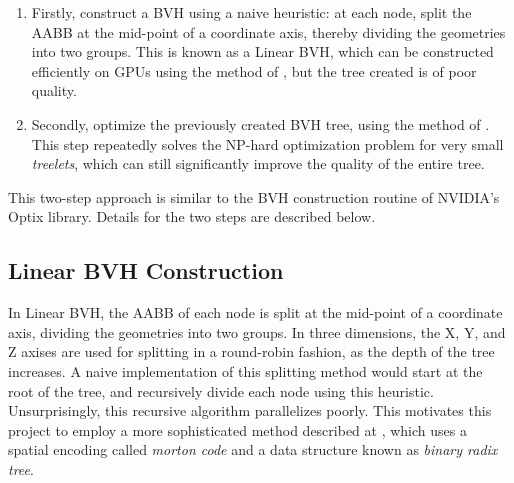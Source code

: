 \begin{enumerate}
    \item Firstly, construct a BVH using a naive heuristic: at each node, split the AABB at the mid-point of a coordinate axis, thereby dividing the geometries into two groups. This is known as a Linear BVH, which can be constructed efficiently on GPUs using the method of \cite{bvh_build}, but the tree created is of poor quality.
    \item Secondly, optimize the previously created BVH tree, using the method of \cite{bvh_optimize}. This step repeatedly solves the NP-hard optimization problem for very small \textit{treelets}, which can still significantly improve the quality of the entire tree.
\end{enumerate}
This two-step approach is similar to the BVH construction routine of NVIDIA's Optix library. Details for the two steps are described below.

\subsection{Linear BVH Construction}
In Linear BVH, the AABB of each node is split at the mid-point of a coordinate axis, dividing the geometries into two groups. In three dimensions, the X, Y, and Z axises are used for splitting in a round-robin fashion, as the depth of the tree increases. A naive implementation of this splitting method would start at the root of the tree, and recursively divide each node using this heuristic. Unsurprisingly, this recursive algorithm parallelizes poorly. This motivates this project to employ a more sophisticated method described at \cite{bvh_build}, which uses a spatial encoding called \textit{morton code} and a data structure known as \textit{binary radix tree}.

